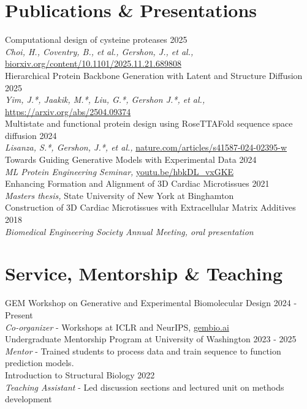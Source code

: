 \documentclass[letter]{res}
\begin{document}
\begin{resume}
\section{Publications \& Presentations}
Computational design of cysteine proteases \hfill 2025\\
\textit{Choi, H., Coventry, B., et al., Gershon, J., et al.,} \href{https://www.biorxiv.org/content/10.1101/2025.11.21.689808}{biorxiv.org/content/10.1101/2025.11.21.689808}\\[3pt]
Hierarchical Protein Backbone Generation with Latent and Structure Diffusion \hfill 2025\\
\textit{Yim, J.*, Jaakik, M.*, Liu, G.*, Gershon J.*, et al.,} \href{https://arxiv.org/abs/2504.09374}{https://arxiv.org/abs/2504.09374}\\[3pt]
Multistate and functional protein design using RoseTTAFold sequence space diffusion \hfill 2024\\
\textit{Lisanza, S.*, Gershon, J.*, et al.,} \href {https://www.nature.com/articles/s41587-024-02395-w}{nature.com/articles/s41587-024-02395-w}\\[3pt]
Towards Guiding Generative Models with Experimental Data \hfill 2024\\
\textit{ML Protein Engineering Seminar,} \href{https://youtu.be/hbkDL_vxGKE}{youtu.be/hbkDL\_vxGKE}\\[3pt]
Enhancing Formation and Alignment of 3D Cardiac Microtissues \hfill 2021\\
\textit{Masters thesis,} State University of New York at Binghamton\\[3pt]
Construction of 3D Cardiac Microtissues with Extracellular Matrix Additives \hfill 2018\\
\textit{ Biomedical Engineering Society Annual Meeting, oral presentation}
    \vspace{-2mm}

\section{Service, Mentorship \& Teaching}
GEM Workshop on Generative and Experimental Biomolecular Design \hfill 2024 - Present\\
\textit{Co-organizer} - Workshops at ICLR and NeurIPS, \href{https://www.gembio.ai}{gembio.ai}\\[3pt]
Undergraduate Mentorship Program at University of Washington \hfill 2023 - 2025 \\
\textit{Mentor} - Trained students to process data and train sequence to function prediction models. \\[3pt]
Introduction to Structural Biology \hfill 2022\\
\textit{Teaching Assistant} - Led discussion sections and lectured unit on methods development\\
 \vspace{-4mm}


\end{resume}
\end{document}
